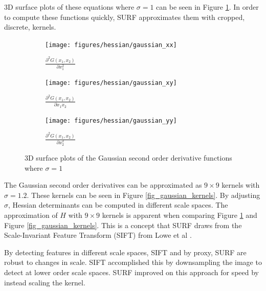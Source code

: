 \documentclass{article}
\begin{document}
3D surface plots of these equations where $\sigma=1$ can be seen in Figure \ref{fig_gaussian_surface_plots}. In order to compute these functions quickly, SURF approximates them with cropped, discrete, kernels. 

\begin{figure}[h]
	\centering
	\begin{subfigure}[b]{0.45\textwidth}
		\centering
		\texttt{[image: figures/hessian/gaussian\_xx]}
		\caption{$\frac{\partial^2 G(x_1, x_2)}{\partial x_1^2}$}
	\end{subfigure}
	\begin{subfigure}[b]{0.45\textwidth}
		\centering
		\texttt{[image: figures/hessian/gaussian\_xy]}
		\caption{$\frac{\partial^2 G(x_1, x_2)}{\partial x_1 x_2}$}
	\end{subfigure}
	\begin{subfigure}[b]{0.45\textwidth}
		\centering
		\texttt{[image: figures/hessian/gaussian\_yy]}
		\caption{$\frac{\partial^2 G(x_1, x_2)}{\partial x_2^2}$}
	\end{subfigure}
	\caption{3D surface plots of the Gaussian second order derivative functions where $\sigma=1$}
	\label{fig_gaussian_surface_plots}
\end{figure}

The Gaussian second order derivatives can be approximated as $9 \times 9$ kernels with $\sigma=1.2$. These kernels can be seen in Figure \ref{fig_gaussian_kernels}. By adjusting $\sigma$, Hessian determinants can be computed in different scale spaces. The approximation of $H$ with $9 \times 9$ kernels is apparent when comparing Figure \ref{fig_gaussian_surface_plots} and Figure \ref{fig_gaussian_kernels}. This is a concept that SURF draws from the Scale-Invariant Feature Transform (SIFT) from Lowe et al \cite{lowe_distinctive_2004}.

 By detecting features in different scale spaces, SIFT and by proxy, SURF are robust to changes in scale. SIFT accomplished this by downsampling the image to detect at lower order scale spaces. SURF improved on this approach for speed by instead scaling the kernel.
\end{document}
